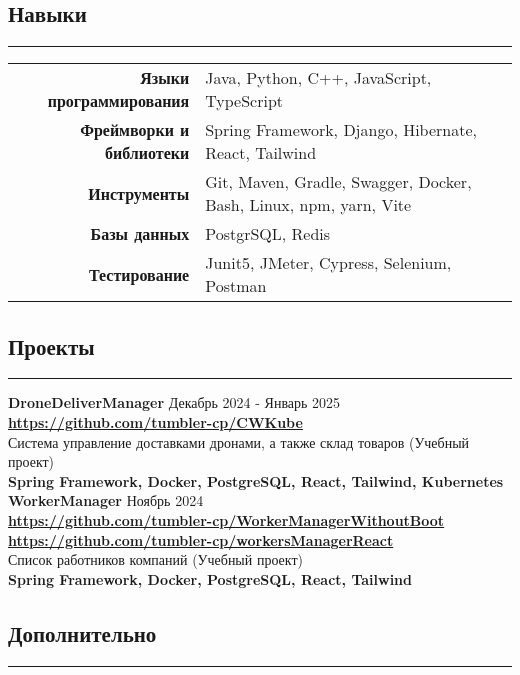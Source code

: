 \documentclass[a4paper,10pt]{article}
\begin{document}
\subsection*{Навыки}
\hrule
\vspace*{5mm}
\begin{tabular}{r | l }
    \textbf{Языки программирования} & Java, Python, C++, JavaScript, TypeScript\\
    \textbf{Фреймворки и библиотеки} & Spring Framework, Django, Hibernate, React, Tailwind \\
    \textbf{Инструменты} & Git, Maven, Gradle, Swagger, Docker, Bash, Linux, npm, yarn, Vite \\
    \textbf{Базы данных} & PostgrSQL, Redis \\
    \textbf{Тестирование} & Junit5, JMeter, Cypress, Selenium, Postman \\
\end{tabular}
\subsection*{Проекты}
\hrule
\vspace*{5mm}
\textbf{DroneDeliverManager} Декабрь 2024 - Январь 2025\\
\faGithub \hspace*{3mm} \textbf{\url{https://github.com/tumbler-cp/CWKube}} \\
Система управление доставками дронами, а также склад товаров (Учебный проект) \\
\textbf{Spring Framework, Docker, PostgreSQL, React, Tailwind, Kubernetes} \\

\vspace*{5mm}
\noindent\textbf{WorkerManager} Ноябрь 2024\\
\faGithub \hspace*{3mm} \textbf{\url{https://github.com/tumbler-cp/WorkerManagerWithoutBoot}} \\
\faGithub \hspace*{3mm} \textbf{\url{https://github.com/tumbler-cp/workersManagerReact}} \\
Список работников компаний (Учебный проект) \\
\textbf{Spring Framework, Docker, PostgreSQL, React, Tailwind} \\

\subsection*{Дополнительно}
\hrule
\vspace*{5mm}
\end{document}
